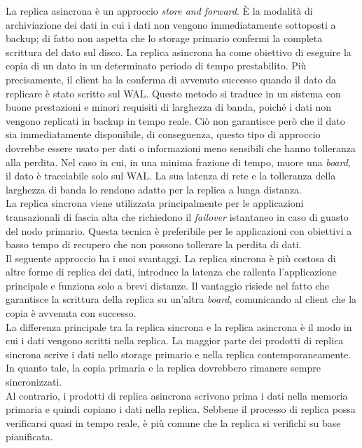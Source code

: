 La replica asincrona \`{e} un approccio \textit{store and forward}.
\`{E} la modalit\`{a} di archiviazione dei dati in cui i dati non vengono immediatamente sottoposti a backup; di fatto non aspetta che lo storage primario confermi la completa scrittura del dato sul disco. La replica asincrona ha come obiettivo di eseguire la copia di un dato in un determinato periodo di tempo prestabilito. Pi\`{u} precisamente, il client ha la conferma di avvenuto successo quando il dato da replicare \`{e} stato scritto sul WAL. Questo metodo si traduce in un sistema con buone prestazioni e minori requisiti di larghezza di banda, poich\'{e} i dati non vengono replicati in backup in tempo reale. Ci\`{o} non garantisce per\`{o} che il dato sia immediatamente disponibile, di conseguenza, questo tipo di approccio dovrebbe essere usato per dati o informazioni meno sensibili che hanno tolleranza alla perdita. Nel caso in cui, in una minima frazione di tempo, muore una \textit{board}, il dato \`{e} tracciabile solo sul WAL. La sua latenza di rete e la tolleranza della larghezza di banda lo rendono adatto per la replica a lunga distanza.\\

La replica sincrona viene utilizzata principalmente per le applicazioni transazionali di fascia alta che richiedono il \textit{failover} istantaneo in caso di guasto del nodo primario. 
Questa tecnica \`{e} preferibile per le applicazioni con obiettivi a basso tempo di recupero che non possono tollerare la perdita di dati.\\
Il seguente approccio ha i suoi svantaggi. La replica sincrona \`{e} pi\`{u} costosa di altre forme di replica dei dati, introduce la latenza che rallenta l'applicazione principale e funziona solo a brevi distanze. Il vantaggio risiede nel fatto che garantisce la scrittura della replica su un'altra \textit{board}, comunicando al client che la copia \`{e} avvenuta con successo. \\

La differenza principale tra la replica sincrona e la replica asincrona \`{e} il modo in cui i dati vengono scritti nella replica. La maggior parte dei prodotti di replica sincrona scrive i dati nello storage primario e nella replica contemporaneamente. In quanto tale, la copia primaria e la replica dovrebbero rimanere sempre sincronizzati.\\
Al contrario, i prodotti di replica asincrona scrivono prima i dati nella memoria primaria e quindi copiano i dati nella replica. Sebbene il processo di replica possa verificarsi quasi in tempo reale, \`{e} pi\`{u} comune che la replica si verifichi su base pianificata. \\

